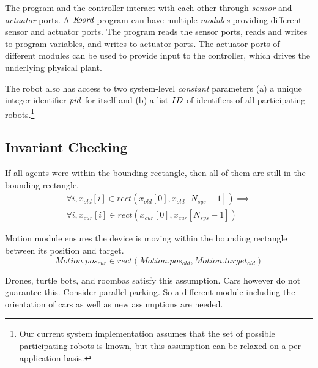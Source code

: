 The program and the controller interact with each other through \emph{sensor} and \emph{actuator} ports.
A $\emph{K\kern-2pt oord}$ program can have multiple \emph{modules} providing different sensor and actuator ports.
The program reads the sensor ports, reads and writes to program variables, and writes to actuator ports.
The actuator ports of different modules can be used to provide input to the controller, which drives the underlying physical plant.


The robot also has access to two system-level \emph{constant} parameters (a) a unique integer identifier $\mathit{pid}$ for itself and (b) a list $ID$ of identifiers of all participating robots.\footnote{Our current system implementation assumes that the set of possible participating robots is known, but this assumption can be relaxed on a per application basis.}


\subsection{Invariant Checking}

\begin{invariant}
If all agents were within the bounding rectangle, then all of them are still in the bounding rectangle.
\[
\begin{split}
\forall i, x_{old}[i] \in rect(x_{old}[0], x_{old}[N_{sys}-1]) \implies \\
\forall i, x_{cur}[i] \in rect(x_{cur}[0], x_{cur}[N_{sys}-1])
\end{split}
\]
\end{invariant}


\begin{assumption}
Motion module ensures the device is moving within the bounding rectangle between its position and target.
\[
Motion.pos_{cur} \in rect(Motion.pos_{old}, Motion.target_{old})
\]
\end{assumption}

Drones, turtle bots, and roombas satisfy this assumption.
Cars however do not guarantee this. Consider parallel parking.
So a different module including the orientation of cars as well as new assumptions are needed.
